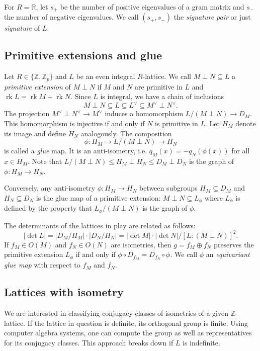 \documentclass[a4paper]{amsart}
\theoremstyle{definition}
\theoremstyle{plain}
\DeclareMathOperator{\rk}{rk}
\newcommand{\RR}{\mathbb{R}}
\newcommand{\ZZ}{\mathbb{Z}}
\begin{document}
%
%
For $R=\RR$, let $s_+$ be the number of positive eigenvalues of a gram matrix and $s_-$ the number of negative eigenvalues. We call $(s_+,s_-)$ the \emph{signature pair} or just \emph{signature} of $L$.

%
%

\subsection{Primitive extensions and glue}
Let $R \in \{\ZZ, \ZZ_p\}$ and $L$ be an even integral $R$-lattice.
We call $M \perp N \subseteq L$ a \emph{primitive extension} of $M \perp N$ if $M$ and $N$ are primitive in $L$ and $\rk L = \rk M + \rk N$.
Since $L$ is integral, we have a chain of inclusions
\[M \perp N \subseteq L \subseteq L^\vee \subseteq M^\vee \perp N^\vee.\]
The projection $M^\vee \perp N^\vee \to M^\vee$ induces a homomorphism $L/(M \perp N) \to D_M$. This homomorphism is injective if and only if $N$ is primitive in $L$.
Let $H_M$ denote its image and define $H_N$ analogously. The composition
\[\phi \colon H_M \to L/(M \perp N) \to H_N\]
is called a \emph{glue} map. It is an anti-isometry, i.e. $q_M(x) = -q_N(\phi(x))$ for all $x \in H_M$. Note that $L/(M\perp N) \leq H_M \perp H_N \leq D_M \perp D_N$ is the graph of $\phi\colon H_M \to H_N$.

Conversely, any anti-isometry $\phi \colon H_M \to H_N$ between subgroups $H_M \subseteq D_M$ and $H_N \subseteq D_N$ is the glue map of a primitive extension: $M \perp N \subseteq L_\phi$ where $L_\phi$ is defined by
the property that $L_\phi/(M \perp N)$ is the graph of $\phi$.

The determinants of the lattices in play are related as follows:
\[\lvert\det L\rvert = \lvert D_M/H_M \rvert \cdot \lvert D_N/H_N \rvert = \lvert \det M \rvert \cdot \lvert \det N \rvert/[L : (M \perp N)]^2.\]
If $f_M \in O(M)$ and $f_N \in O(N)$ are isometries, then $g = f_M \oplus f_N$ preserves the primitive extension $L_\phi$ if and only if $\phi \circ D_{f_M} = D_{f_N} \circ \phi$. We call $\phi$ an \emph{equivariant glue map} with respect to $f_M$ and $f_N$.


\subsection{Lattices with isometry}
We are interested in classifying conjugacy classes of isometries of a given $\ZZ$-lattice.
If the lattice in question is definite, its orthogonal group is finite. Using computer algebra systems, one can compute the group as well as representatives for its conjugacy classes. This approach breaks down if $L$ is indefinite.
\end{document}
